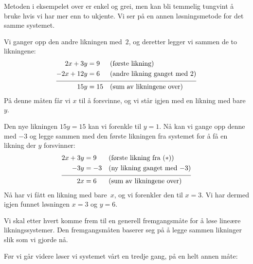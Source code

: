 Metoden i eksempelet over er enkel og grei, men kan bli temmelig
tungvint å bruke hvis vi har mer enn to ukjente.
Vi ser på en annen løsningsmetode for det samme systemet.

\begin{ex}
Vi ganger opp den andre likningen med~$2$, og deretter legger vi
sammen de to likningene:
\begin{align*}
2x + 3y &= 9   &&\text{(første likning)} \\
-2x + 12y &= 6 &&\text{(andre likning ganget med~$2$)} \\[4pt] \hline
\rule{0pt}{11pt}
15y &= 15      &&\text{(sum av likningene over)}
\end{align*}
På denne måten får vi $x$ til å forsvinne, og vi står igjen med en
likning med bare~$y$.

Den nye likningen $15y = 15$ kan vi forenkle til $y=1$.  Nå kan vi
gange opp denne med $-3$ og legge sammen med den første likningen fra
systemet for å få en likning der $y$ forsvinner:
\begin{align*}
2x + 3y &= 9 &&\text{(første likning fra $(\ast)$)}\\
-3y &= -3    &&\text{(ny likning ganget med $-3$)} \\[4pt] \hline
\rule{0pt}{11pt}
2x &= 6      &&\text{(sum av likningene over)}
\end{align*}
Nå har vi fått en likning med bare~$x$, og vi forenkler den til
$x = 3$.
Vi har dermed igjen funnet løsningen $x = 3$ og $y = 6$.
\end{ex}

Vi skal etter hvert komme frem til en generell fremgangsmåte for å
løse lineære likningssystemer.  Den fremgangsmåten baserer seg på å
legge sammen likninger slik som vi gjorde nå.

Før vi går videre løser vi systemet vårt en tredje gang, på en helt
annen måte:

